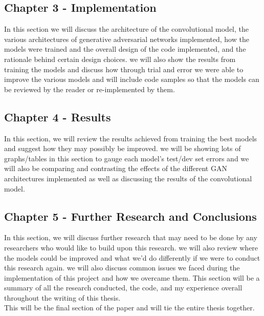\subsection{Chapter 3 - Implementation}
In this section we will discuss the architecture of the convolutional model, the various architectures of generative adversarial networks implemented, how the models were trained and the overall design of the code implemented, and the rationale behind certain design choices. we will also show the results from training the models and discuss how through trial and error we were able to improve the various models and will include code samples so that the models can be reviewed by the reader or re-implemented by them.
\subsection{Chapter 4 - Results}
In this section, we will review the results achieved from training the best models and suggest how they may possibly be improved.  we will be showing lots of graphs/tables in this section to gauge each model's test/dev set errors and we will also be comparing and contrasting the effects of the different GAN architectures implemented as well as discussing the results of the convolutional model.
\subsection{Chapter 5 - Further Research and Conclusions}
In this section, we will discuss further research that may need to be done by any researchers who would like to build upon this research.  we will also review where the models could be improved and what we'd do differently if we were to conduct this research again. we will also discuss common issues we faced during the implementation of this project and how we overcame them. This section will be a summary of all the research conducted, the code, and my experience overall throughout the writing of this thesis.  
\\
This will be the final section of the paper and will tie the entire thesis together.  

 
